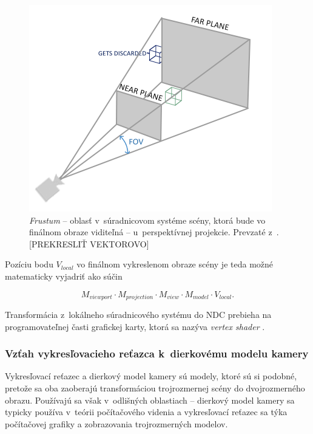 \begin{figure}[h!]
    \centering
    \includegraphics[width=0.5\linewidth]{text_prace/obrazky-figures/perspektivna_projekcia_frustum.png}
    \caption[Frustum u~perspektívnej projekcie.]{\emph{Frustum} -- oblasť v~súradnicovom systéme scény, ktorá bude vo finálnom obraze viditeľná -- u~perspektívnej projekcie. Prevzaté z~\cite{de_vries_coordinate_systems}. [PREKRESLIŤ VEKTOROVO]}
    \label{fig:perspektivna_projekcia_frustum}
\end{figure}

Pozíciu bodu $V_{local}$ vo finálnom vykreslenom obraze scény je teda možné matematicky vyjadriť ako súčin

$$ M_{viewport} \cdot M_{projection} \cdot M_{view} \cdot M_{model} \cdot V_{local} \mathrm{.}$$

Transformácia z~lokálneho súradnicového systému do NDC prebieha na programovateľnej časti grafickej karty, ktorá sa nazýva \emph{vertex shader} \cite{de_vries_coordinate_systems}.

\subsubsection{Vzťah vykresľovacieho reťazca k~dierkovému modelu kamery}

Vykresľovací reťazec a dierkový model kamery sú modely, ktoré sú si podobné, pretože sa oba zaoberajú transformáciou trojrozmernej scény do dvojrozmerného obrazu. Používajú sa však v~odlišných oblastiach -- dierkový model kamery sa typicky používa v~teórii počítačového videnia a vykresľovací reťazec sa týka počítačovej grafiky a zobrazovania trojrozmerných modelov.

